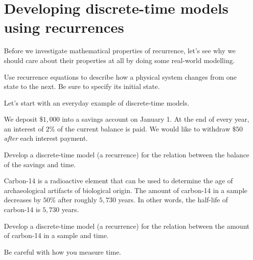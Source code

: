 \documentclass[../main.tex]{subfiles}
\begin{document}
 \section{Developing discrete-time models using recurrences}

Before we investigate mathematical properties of recurrence, let's see why we should care about their properties at all by doing some real-world modelling. 

\begin{method} \label{method:recurrence-modelling}
  Use recurrence equations to describe how a physical system changes from one state to the next.  Be sure to specify its initial state.
\end{method}


Let's start with an everyday example of discrete-time models.
\begin{example} \label{ex:recursion-investment-model}
  We deposit \(\$ 1,000\) into a savings account on January 1. At the end of every year, an interest of \(2\%\) of the current balance is paid. We would like to withdraw \(\$ 50\) \emph{after} each interest payment.

  Develop a discrete-time model (a recurrence) for the relation between the balance of the savings  and time.

  \blanks*
\end{example}
\clearpage

\begin{exercise} \label{ex:recursion-half-life}
  Carbon-14 is a radioactive element that can be used to determine the age of archaeological artifacts of biological origin.  The amount of carbon-14 in a sample decreases by \(50\%\) after roughly \(5,730\) years. In other words, the half-life of carbon-14 is \(5,730\) years. 

  Develop a discrete-time model (a recurrence) for the relation between the amount of carbon-14 in a sample and time. 

  Be careful with how you measure time.

  \blanks*
\end{exercise}
\clearpage
\end{document}
